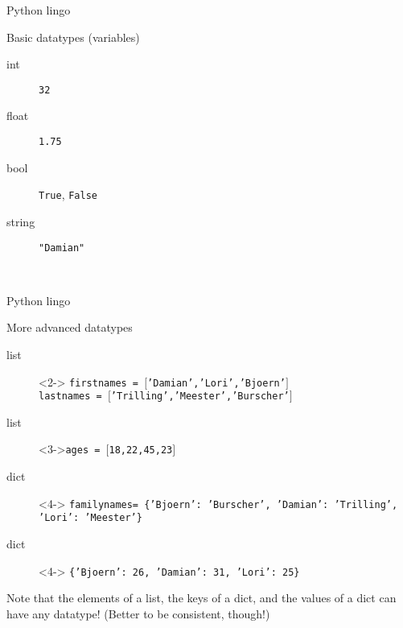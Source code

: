\documentclass{beamer}
\begin{document}
\begin{frame}{Python lingo}
\begin{block}{Basic datatypes (variables)}
\begin{description}
\item[{\color{red}int}] \texttt{32}
\item[{\color{red}float}] \texttt{1.75}
\item[{\color{red}bool}] \texttt{True}, \texttt{False}
\item[{\color{red}string}] \texttt{"Damian"}
\end{description}
\end{block}
\\
\end{frame}



\begin{frame}{Python lingo}
\begin{block}{More advanced datatypes}
\begin{description}
\item[{\color{red}list}]<2-> \texttt{firstnames = $[$'Damian','Lori','Bjoern'$]$ \\ lastnames = $[$'Trilling','Meester','Burscher'$]$}
\item[{\color{red}list}]<3->\texttt{ages = $[$18,22,45,23$]$}
\item[{\color{red}dict}]<4-> \texttt{familynames= \{'Bjoern': 'Burscher', 'Damian': 'Trilling', 'Lori': 'Meester'\} }
\item[{\color{red}dict}]<4-> \texttt{\{'Bjoern': 26, 'Damian': 31, 'Lori': 25\} }

\end{description}
\pause
Note that the elements of a list, the keys of a dict, and the values of a dict can have any datatype! (Better to be consistent, though!)
\end{block}
\end{frame}
\end{document}
